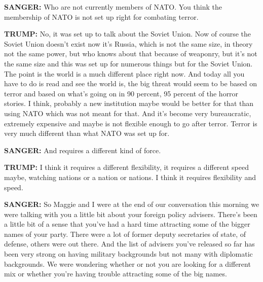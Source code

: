\textbf{SANGER:} Who are not currently members of NATO. You think the
membership of NATO is not set up right for combating terror.

\textbf{TRUMP:} No, it was set up to talk about the Soviet Union. Now of
course the Soviet Union doesn't exist now it's Russia, which is not the
same size, in theory not the same power, but who knows about that
because of weaponry, but it's not the same size and this was set up for
numerous things but for the Soviet Union. The point is the world is a
much different place right now. And today all you have to do is read and
see the world is, the big threat would seem to be based on terror and
based on what's going on in 90 percent, 95 percent of the horror
stories. I think, probably a new institution maybe would be better for
that than using NATO which was not meant for that. And it's become very
bureaucratic, extremely expensive and maybe is not flexible enough to go
after terror. Terror is very much different than what NATO was set up
for.

\textbf{SANGER:} And requires a different kind of force.

\textbf{TRUMP:} I think it requires a different flexibility, it requires
a different speed maybe, watching nations or a nation or nations. I
think it requires flexibility and speed.

\textbf{SANGER:} So Maggie and I were at the end of our conversation
this morning we were talking with you a little bit about your foreign
policy advisers. There's been a little bit of a sense that you've had a
hard time attracting some of the bigger names of your party. There were
a lot of former deputy secretaries of state, of defense, others were out
there. And the list of advisers you've released so far has been very
strong on having military backgrounds but not many with diplomatic
backgrounds. We were wondering whether or not you are looking for a
different mix or whether you're having trouble attracting some of the
big names.

